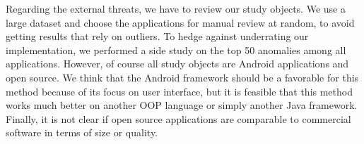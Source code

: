 Regarding the external threats, we have to review our study objects.
We use a large dataset and choose the applications for manual review at random, to avoid getting results that rely on outliers.
To hedge against underrating our implementation, we performed a side study on the top 50 anomalies among all applications.
However, of course all study objects are Android applications and open source.
We think that the Android framework should be a favorable for this method because of its focus on user interface, but it is feasible that this method works much better on another OOP language or simply another Java framework.
Finally, it is not clear if open source applications are comparable to commercial software in terms of size or quality.


